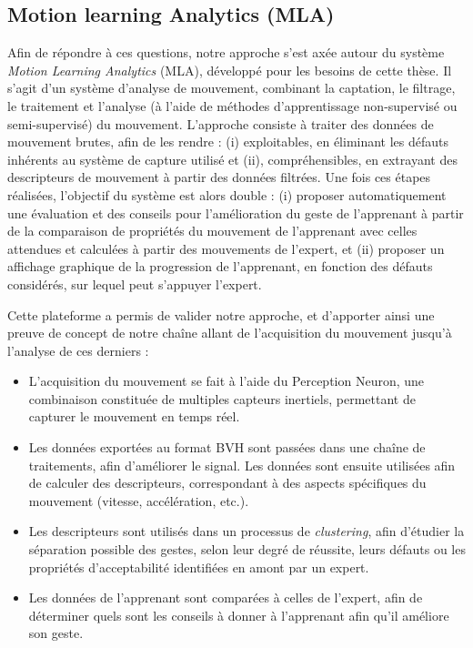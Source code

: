 \subsection{Motion learning Analytics (MLA)}
Afin de répondre à ces questions, notre approche s'est axée autour du système \textit{Motion Learning Analytics} (MLA), développé pour les besoins de cette thèse. Il s'agit d'un système d'analyse de mouvement, combinant la captation, le filtrage, le traitement et l'analyse (à l'aide de méthodes d'apprentissage non-supervisé ou semi-supervisé) du mouvement. L'approche consiste à traiter des données de mouvement brutes, afin de les rendre : (i) exploitables, en éliminant les défauts inhérents au système de capture utilisé et (ii), compréhensibles, en extrayant des descripteurs de mouvement à partir des données filtrées. Une fois ces étapes réalisées, l'objectif du système est alors double : (i) proposer automatiquement une évaluation et des conseils pour l'amélioration du geste de l'apprenant à partir de la comparaison de propriétés du mouvement de l'apprenant avec celles attendues et calculées à partir des mouvements de l'expert, et (ii) proposer un affichage graphique de la progression de l'apprenant, en fonction des défauts considérés, sur lequel peut s'appuyer l'expert.

Cette plateforme a permis de valider notre approche, et d'apporter ainsi une preuve de concept de notre chaîne allant de l'acquisition du mouvement jusqu'à l'analyse de ces derniers :

\begin{itemize}
    \item L'acquisition du mouvement se fait à l'aide du Perception Neuron, une combinaison constituée de multiples capteurs inertiels, permettant de capturer le mouvement en temps réel.
    \item Les données exportées au format BVH sont passées dans une chaîne de traitements, afin d'améliorer le signal. Les données sont ensuite utilisées afin de calculer des descripteurs, correspondant à des aspects spécifiques du mouvement (vitesse, accélération, etc.).
    \item Les descripteurs sont utilisés dans un processus de \textit{clustering}, afin d'étudier la séparation possible des gestes, selon leur degré de réussite, leurs défauts ou les propriétés d'acceptabilité identifiées en amont par un expert.
    \item Les données de l'apprenant sont comparées à celles de l'expert, afin de déterminer quels sont les conseils à donner à l'apprenant afin qu'il améliore son geste.
\end{itemize}

